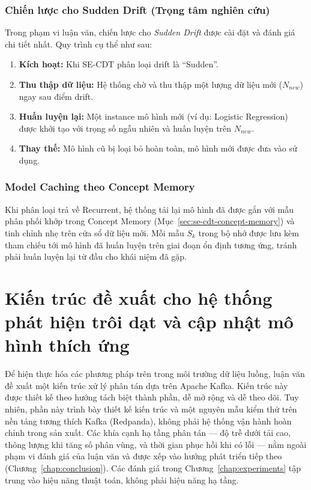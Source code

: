 \subsubsection{Chiến lược cho Sudden Drift (Trọng tâm nghiên cứu)}
Trong phạm vi luận văn, chiến lược cho \textit{Sudden Drift} được cài đặt và đánh giá chi tiết nhất. Quy trình cụ thể như sau:
\begin{enumerate}
	\item \textbf{Kích hoạt:} Khi SE-CDT phân loại drift là ``Sudden''.
	\item \textbf{Thu thập dữ liệu:} Hệ thống chờ và thu thập một lượng dữ liệu mới ($N_{new}$) ngay sau điểm drift.
	\item \textbf{Huấn luyện lại:} Một instance mô hình mới (ví dụ: Logistic Regression) được khởi tạo với trọng số ngẫu nhiên và huấn luyện trên $N_{new}$.
	\item \textbf{Thay thế:} Mô hình cũ bị loại bỏ hoàn toàn, mô hình mới được đưa vào sử dụng.
\end{enumerate}

\subsubsection{Model Caching theo Concept Memory}
Khi phân loại trả về Recurrent, hệ thống tải lại mô hình đã được gắn với mẫu phân phối khớp trong Concept Memory (Mục~\ref{sec:se-cdt-concept-memory}) và tinh chỉnh nhẹ trên cửa sổ dữ liệu mới. Mỗi mẫu $S_k$ trong bộ nhớ được lưu kèm tham chiếu tới mô hình đã huấn luyện trên giai đoạn ổn định tương ứng, tránh phải huấn luyện lại từ đầu cho khái niệm đã gặp.

\section{Kiến trúc đề xuất cho hệ thống phát hiện trôi dạt và cập nhật mô hình thích ứng}
\label{sec:system-architecture}

Để hiện thực hóa các phương pháp trên trong môi trường dữ liệu luồng, luận văn đề xuất một kiến trúc xử lý phân tán dựa trên Apache Kafka. Kiến trúc này được thiết kế theo hướng tách biệt thành phần, dễ mở rộng và dễ theo dõi. Tuy nhiên, phần này trình bày thiết kế kiến trúc và một nguyên mẫu kiểm thử trên nền tảng tương thích Kafka (Redpanda), không phải hệ thống vận hành hoàn chỉnh trong sản xuất. Các khía cạnh hạ tầng phân tán --- độ trễ dưới tải cao, thông lượng khi tăng số phân vùng, và thời gian phục hồi khi có lỗi --- nằm ngoài phạm vi đánh giá của luận văn và được xếp vào hướng phát triển tiếp theo (Chương~\ref{chap:conclusion}).
Các đánh giá trong Chương~\ref{chap:experiments} tập trung vào hiệu năng thuật toán, không phải hiệu năng hạ tầng.

